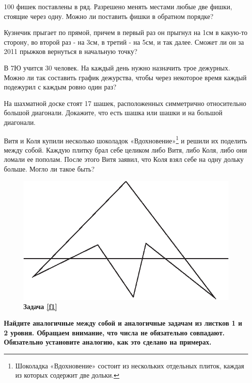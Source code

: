 \begin{thm}100 фишек поставлены в ряд. Разрешено менять местами любые две фишки, стоящие через одну. Можно ли поставить фишки в обратном порядке?
\end{thm}

\begin{thm}
	Кузнечик прыгает по прямой, причем в первый раз он прыгнул на 1см в какую-то сторону, во второй раз - на 3см, в третий - на 5см, и так далее. Сможет ли он за 2011 прыжков вернуться в начальную точку?
\end{thm}

\begin{thm}
	В 7Ю учится 30 человек. На каждый день нужно назначить трое дежурных. Можно ли так составить график дежурства, чтобы через некоторое время каждый подежурил с каждым ровно один раз?
\end{thm}

\begin{thm}
	На шахматной доске стоят 17 шашек, расположенных симметрично относительно большой диагонали. Докажите, что есть шашка или шашки и на большой диагонали.
\end{thm}	

\begin{thm}
	Витя и Коля купили несколько шоколадок «Вдохновение»\footnote{Шоколадка «Вдохновение» состоит из нескольких отдельных плиток, каждая из которых содержит две дольки.} и решили их поделить между собой. Каждую плитку брал себе целиком либо Витя, либо Коля, либо они ломали ее пополам. После этого Витя заявил, что Коля взял себе на одну дольку больше. Могло ли такое быть? 
\end{thm}
\begin{figure}[h]\centering
	\includegraphics[width=8 cm]{./img/six}
	\caption{\textbf{Задача \ref{f1}}}
\end{figure}


\textbf{Найдите аналогичные между собой и аналогичные задачам из листков 1 и 2 уровня. Обращаем внимание, что числа не обязательно совпадают. Обязательно установите аналогию, как это сделано на примерах.}

